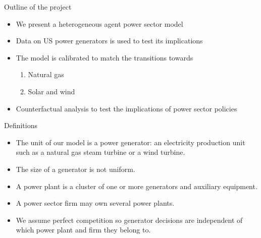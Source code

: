 \documentclass{beamer}
\begin{document}
\begin{frame}{Outline of the project}

\begin{itemize}
    \item We present a heterogeneous agent power sector model
    \item Data on US power generators is used to test its implications
    \item The model is calibrated to match the transitions towards
    \begin{enumerate}
        \item Natural gas
        \item Solar and wind
    \end{enumerate}
    \item Counterfactual analysis to test the implications of power sector policies
\end{itemize}

    
\end{frame}

\begin{frame}{Definitions}

\begin{itemize}
 \item The unit of our model is a power generator: an electricity production unit such as a natural gas steam turbine or a wind turbine.
 \item The size of a generator is not uniform.
 \item A power plant is a cluster of one or more generators and auxiliary equipment.
 \item A power sector firm may own several power plants.
 \item We assume perfect competition so generator decisions are independent of which power plant and firm they belong to.
\end{itemize}
    
\end{frame}
\end{document}
